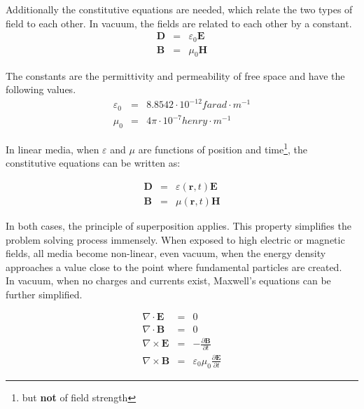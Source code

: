 \documentclass[a4paper,14pt]{extbook}
\begin{document}
Additionally the constitutive equations are needed, which relate the two types of field to each other. In vacuum, the fields are related to each other by a constant.\\

\begin{eqnarray}
\mathbf{D} &=& \varepsilon_0 \mathbf{E} \label{constitutive_1_vacuum} \\
\mathbf{B} &=& \mu_0 \mathbf{H} \label{constitutive_2_vacuum}
\end{eqnarray}

The constants are the permittivity and permeability of free space and have the following values.\\

\begin{eqnarray}
  \varepsilon_0 &=& 8.8542 \cdot 10^{-12} farad \cdot m^{-1} \\
\mu_0 &=& 4 \pi \cdot 10^{-7} henry \cdot m^{-1}
\end{eqnarray}


In linear media, when $\varepsilon$ and $\mu$ are functions of position and time\footnote{but \textbf{not} of field strength}, the constitutive equations can be written as:

\begin{eqnarray}
\mathbf{D} &=& \varepsilon (\mathbf{r},t) \mathbf{E} \label{constitutive_1_linear} \\
\mathbf{B} &=& \mu (\mathbf{r},t) \mathbf{H} \label{constitutive_2_linear}
\end{eqnarray}


In both cases, the principle of superposition applies. This property simplifies the problem solving process immensely. When exposed to high electric or magnetic fields, all media become non-linear, even vacuum, when the energy density approaches a value close to the point where fundamental particles are created.\\


In vacuum, when no charges and currents exist, Maxwell's equations can be further simplified.

\begin{eqnarray}
\nabla \cdot \mathbf{E}&=& 0 \label{maxwell_freespace_nosource_1}\\
\nabla \cdot \mathbf{B}&=& 0 \label{maxwell_freespace_nosource_2}\\
\nabla \times \mathbf{E}&=& -\frac{\partial \mathbf{B}}{\partial t} \label{maxwell_freespace_nosource_3}\\
\nabla \times \mathbf{B}&=& \varepsilon_0 \mu_0 \frac{\partial \mathbf{E}}{\partial t} \label{maxwell_freespace_nosource_4}
\end{eqnarray}
\end{document}

